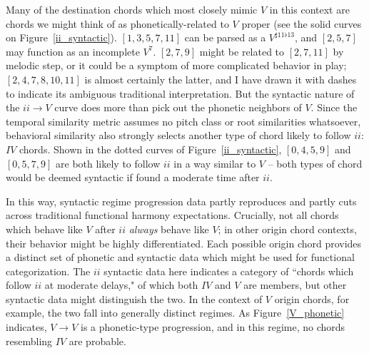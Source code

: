 Many of the destination chords which most closely mimic $V$ in this context are chords we might think of as phonetically-related to $V$ proper (see the solid curves on Figure~\ref{ii_syntactic}).  $[1,3,5,7,11]$ can be parsed as a $V^{\sharp 11 \flat 13}$, and $[2,5,7]$ may function as an incomplete $V^7$.  $[2,7,9]$ might be related to $[2,7,11]$ by melodic step, or it could be a symptom of more complicated behavior in play; $[2,4,7,8,10,11]$ is almost certainly the latter, and I have drawn it with dashes to indicate its ambiguous traditional interpretation.  But the syntactic nature of the $ii \rightarrow V$ curve does more than pick out the phonetic neighbors of $V$.  Since the temporal similarity metric assumes no pitch class or root similarities whatsoever, behavioral similarity also strongly selects another type of chord likely to follow $ii$: $IV$ chords.  Shown in the dotted curves of Figure~\ref{ii_syntactic}, $[0,4,5,9]$ and $[0,5,7,9]$ are both likely to follow $ii$ in a way similar to $V$ -- both types of chord would be deemed syntactic if found a moderate time after $ii$.

In this way, syntactic regime progression data partly reproduces and partly cuts across traditional functional harmony expectations.  Crucially, not all chords which behave like $V$ after $ii$ \emph{always} behave like $V$; in other origin chord contexts, their behavior might be highly differentiated.  Each possible origin chord provides a distinct set of phonetic and syntactic data which might be used for functional categorization.  The $ii$ syntactic data here indicates a category of ``chords which follow $ii$ at moderate delays," of which both $IV$ and $V$ are members, but other syntactic data might distinguish the two.  In the context of $V$ origin chords, for example, the two fall into generally distinct regimes.  As Figure~\ref{V_phonetic} indicates, $V \rightarrow V$ is a phonetic-type progression, and in this regime, no chords resembling $IV$ are probable.

